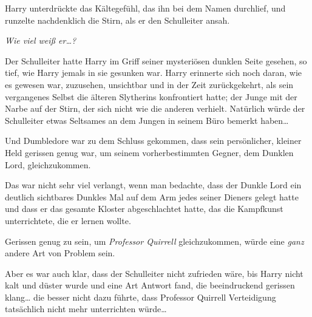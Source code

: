 Harry unterdrückte das Kältegefühl, das ihn bei dem Namen durchlief, und runzelte nachdenklich die Stirn, als er den Schulleiter ansah.

\emph{Wie viel weiß er…?}

Der Schulleiter hatte Harry im Griff seiner mysteriösen dunklen Seite gesehen, so tief, wie Harry jemals in sie gesunken war. Harry erinnerte sich noch daran, wie es gewesen war, zuzusehen, unsichtbar und in der Zeit zurückgekehrt, als sein vergangenes Selbst die älteren Slytherins konfrontiert hatte; der Junge mit der Narbe auf der Stirn, der sich nicht wie die anderen verhielt. Natürlich würde der Schulleiter etwas Seltsames an dem Jungen in seinem Büro bemerkt haben…

Und Dumbledore war zu dem Schluss gekommen, dass sein persönlicher, kleiner Held gerissen genug war, um seinem vorherbestimmten Gegner, dem Dunklen Lord, gleichzukommen.

Das war nicht sehr viel verlangt, wenn man bedachte, dass der Dunkle Lord ein deutlich sichtbares Dunkles Mal auf dem Arm jedes seiner Dieners gelegt hatte und dass er das gesamte Kloster abgeschlachtet hatte, das die Kampfkunst unterrichtete, die er lernen wollte.

Gerissen genug zu sein, um \emph{Professor Quirrell} gleichzukommen, würde eine \emph{ganz} andere Art von Problem sein.

Aber es war auch klar, dass der Schulleiter nicht zufrieden wäre, bis Harry nicht kalt und düster wurde und eine Art Antwort fand, die beeindruckend gerissen klang… die besser nicht dazu führte, dass Professor Quirrell Verteidigung tatsächlich nicht mehr unterrichten würde…

